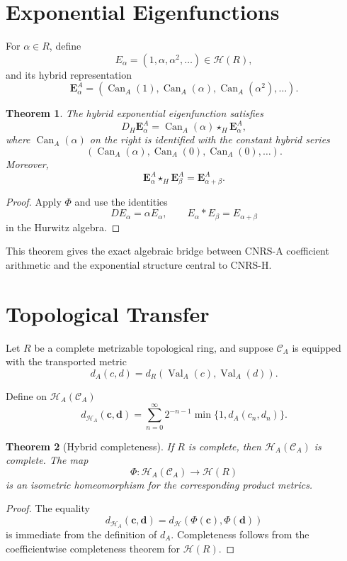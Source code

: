 \documentclass[11pt]{article}
\newtheorem{theorem}{Theorem}[section]
\newcommand{\HA}{\mathcal H_A}
\newcommand{\HR}{\mathcal H}
\newcommand{\CA}{\mathcal C_A}
\newcommand{\Val}{\operatorname{Val}_A}
\newcommand{\Can}{\operatorname{Can}_A}
\begin{document}
\section{Exponential Eigenfunctions}

For $\alpha\in R$, define
\[
E_\alpha=(1,\alpha,\alpha^2,\ldots)\in\HR(R),
\]
and its hybrid representation
\[
\mathbf E_\alpha^A
=
(\Can(1),\Can(\alpha),\Can(\alpha^2),\ldots).
\]

\begin{theorem}
The hybrid exponential eigenfunction satisfies
\[
D_H\mathbf E_\alpha^A
=
\Can(\alpha)\star_H\mathbf E_\alpha^A,
\]
where $\Can(\alpha)$ on the right is identified with the constant hybrid series
\[
(\Can(\alpha),\Can(0),\Can(0),\ldots).
\]
Moreover,
\[
\mathbf E_\alpha^A\star_H\mathbf E_\beta^A
=
\mathbf E_{\alpha+\beta}^A.
\]
\end{theorem}

\begin{proof}
Apply $\Phi$ and use the identities
\[
D E_\alpha=\alpha E_\alpha,
\qquad
E_\alpha*E_\beta=E_{\alpha+\beta}
\]
in the Hurwitz algebra.
\end{proof}

This theorem gives the exact algebraic bridge between CNRS-A coefficient arithmetic and the exponential structure central to CNRS-H.

\section{Topological Transfer}

Let $R$ be a complete metrizable topological ring, and suppose $\CA$ is equipped with the transported metric
\[
d_A(c,d)=d_R(\Val(c),\Val(d)).
\]

Define on $\HA(\CA)$
\[
d_{\HA}(\mathbf c,\mathbf d)
=
\sum_{n=0}^{\infty}
2^{-n-1}
\min\{1,d_A(c_n,d_n)\}.
\]

\begin{theorem}[Hybrid completeness]
If $R$ is complete, then $\HA(\CA)$ is complete.  The map
\[
\Phi:\HA(\CA)\to\HR(R)
\]
is an isometric homeomorphism for the corresponding product metrics.
\end{theorem}

\begin{proof}
The equality
\[
d_{\HA}(\mathbf c,\mathbf d)
=
d_{\HR}(\Phi(\mathbf c),\Phi(\mathbf d))
\]
is immediate from the definition of $d_A$.  Completeness follows from the coefficientwise completeness theorem for $\HR(R)$.
\end{proof}
\end{document}
